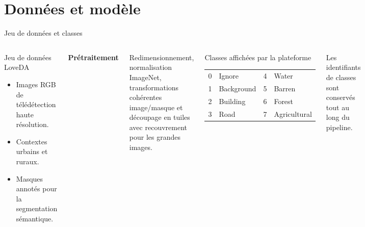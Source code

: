 \documentclass[10pt,aspectratio=169]{beamer}
\begin{document}
\section{Données et modèle}

\begin{frame}{Jeu de données et classes}
  \begin{columns}[T]
      \begin{block}{Jeu de données LoveDA}
        \begin{itemize}
          \item Images RGB de télédétection haute résolution.
          \item Contextes urbains et ruraux.
          \item Masques annotés pour la segmentation sémantique.
        \end{itemize}
      \end{block}
      \vspace{0.2cm}
      \textbf{Prétraitement}\par
      Redimensionnement, normalisation ImageNet, transformations cohérentes image/masque et découpage en tuiles avec recouvrement pour les grandes images.
      \begin{block}{Classes affichées par la plateforme}
        \small
        \begin{tabular}{@{}ll@{\qquad}ll@{}}
          0 & Ignore & 4 & Water \\
          1 & Background & 5 & Barren \\
          2 & Building & 6 & Forest \\
          3 & Road & 7 & Agricultural \\
        \end{tabular}
      \end{block}
      \vspace{0.1cm}
      \alert{Les identifiants de classes sont conservés tout au long du pipeline.}
  \end{columns}
\end{frame}
\end{document}

